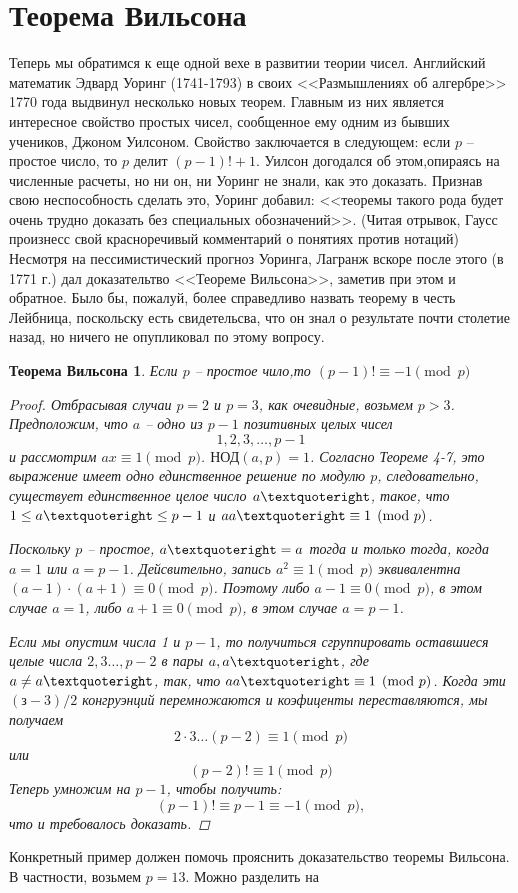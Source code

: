 \documentclass[4apaper,11pt]{article}
\newtheorem*{theorem}{Теорема Вильсона}
\begin{document}
\section{Теорема Вильсона}
Теперь мы обратимся к еще одной вехе в развитии теории чисел. Английский математик Эдвард Уоринг (1741-1793) в своих <<Размышлениях об алгербре>> 1770 года выдвинул несколько новых теорем. Главным из них является интересное свойство простых чисел, сообщенное ему одним из бывших учеников,  Джоном Уилсоном. Свойство заключается в следующем: если $p$ -- простое число, то $p$ делит $(p-1)!+1$. Уилсон догодался об этом,опираясь на численные расчеты, но ни он, ни Уоринг не знали, как это доказать. Признав свою неспособность сделать это, Уоринг добавил: <<теоремы такого рода будет очень трудно доказать без специальных обозначений>>. (Читая отрывок, Гаусс произнесс свой красноречивый комментарий о понятиях против нотаций)	Несмотря на пессимистический прогноз Уоринга, Лагранж вскоре после этого (в 1771 г.) дал доказательтво <<Теореме Вильсона>>, заметив при этом и обратное. Было бы, пожалуй, более справедливо назвать теорему в честь Лейбница, поскольску есть свидетельсва, что он знал о результате почти столетие назад, но ничего не опупликовал по этому вопросу.
\begin{theorem}
Если $p$ -- простое чило,то $(p-1)!\equiv -1\pmod p$	
	\begin{proof}
	Отбрасывая случаи $p=2$ и $p=3$, как очевидные, возьмем $p>3$. Предположим, что $a$ -- одно из $p-1$ позитивных целых чисел 
	\[1, 2, 3,\dots, p-1\]
	и рассмотрим $ax\equiv 1\pmod p$. $\text{НОД}(a,p)=1$. Согласно Теореме 4-7, это выражение имеет одно единственное решение по модулю $p$, следовательно, существует единственное целое число $a\textquoteright$, такое, что $1\leq a\textquoteright\leq p-1$ и $a a\textquoteright \equiv 1\pmod p$.
	
	Поскольку $p$ -- простое, $a\textquoteright=a$ тогда и только тогда, когда $a=1$ или $a=p-1$. Дейсвительно, запись $a^2\equiv 1\pmod p$ эквивалентна $(a-1)\cdot(a+1)\equiv 0\pmod p$. Поэтому либо $a-1\equiv 0\pmod p$,  в этом случае $a=1$, либо $a+1\equiv0\pmod p$, в этом случае $a=p-1$.
	
	Если мы опустим числа 1 и $p-1$, то получиться сгруппировать оставшиеся целые числа $2,3\dots,p-2$ в пары $a,a\textquoteright$, где $a\neq a\textquoteright$, так, что $aa\textquoteright\equiv 1\pmod p$. Когда эти $(з-3)/2$ конгруэнций перемножаются и коэфиценты переставляются, мы получаем
	\[2\cdot3\dots(p-2)\equiv 1\pmod p\] или
	\[(p-2)!\equiv 1\pmod p\]
	Теперь умножим на $p-1$, чтобы получить:
	\[(p-1)!\equiv p-1\equiv -1\pmod p,\] 
	что и требовалось доказать.
	\end{proof}
\end{theorem}
Конкретный пример должен помочь прояснить доказательство теоремы Вильсона. В частности, возьмем $p=13$. Можно разделить на 
\end{document}
